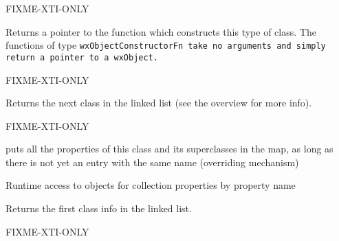 FIXME-XTI-ONLY


\label{wxclassinfogetconstructor}


Returns a pointer to the function which constructs this type of class.
The functions of type \tt{wxObjectConstructorFn} take no arguments and
simply return a pointer to a wxObject.

FIXME-XTI-ONLY






\label{wxclassinfogetnext}


Returns the next class in the linked list (see the overview for more info).

FIXME-XTI-ONLY


\label{wxclassinfogetproperties}


puts all the properties of this class and its superclasses in the map, 
as long as there is not yet an entry with the same name (overriding mechanism)


\label{wxclassinfogetproperty}



\label{wxclassinfogetpropertycollection}


Runtime access to objects for collection properties by property name



\label{wxclassinfogetfirst}


Returns the first class info in the linked list.

FIXME-XTI-ONLY

\label{wxclassinfogetfirsthandler}


